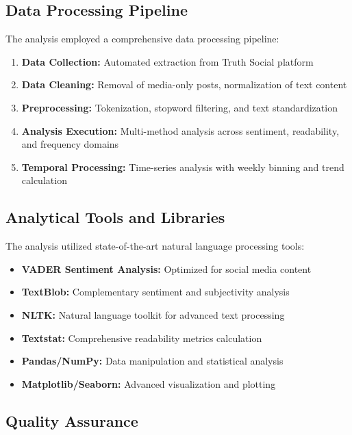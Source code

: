 \documentclass[12pt,a4paper]{article}
\begin{document}
\subsection{Data Processing Pipeline}

The analysis employed a comprehensive data processing pipeline:

\begin{enumerate}
    \item \textbf{Data Collection:} Automated extraction from Truth Social platform
    \item \textbf{Data Cleaning:} Removal of media-only posts, normalization of text content
    \item \textbf{Preprocessing:} Tokenization, stopword filtering, and text standardization
    \item \textbf{Analysis Execution:} Multi-method analysis across sentiment, readability, and frequency domains
    \item \textbf{Temporal Processing:} Time-series analysis with weekly binning and trend calculation
\end{enumerate}

\subsection{Analytical Tools and Libraries}

The analysis utilized state-of-the-art natural language processing tools:

\begin{itemize}
    \item \textbf{VADER Sentiment Analysis:} Optimized for social media content
    \item \textbf{TextBlob:} Complementary sentiment and subjectivity analysis
    \item \textbf{NLTK:} Natural language toolkit for advanced text processing
    \item \textbf{Textstat:} Comprehensive readability metrics calculation
    \item \textbf{Pandas/NumPy:} Data manipulation and statistical analysis
    \item \textbf{Matplotlib/Seaborn:} Advanced visualization and plotting
\end{itemize}

\subsection{Quality Assurance}
\end{document}
